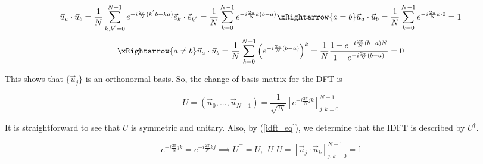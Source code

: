 \begin{equation*}
    \vec{u}_a \cdot \vec{u}_b = \frac{1}{N}\sum_{k,k^{'} = 0}^{N-1} e^{-i \frac{2\pi}{N} (k^{'}b - ka)}\vec{e}_k \cdot \vec{e}_{k^{'}} = \frac{1}{N}\sum_{k = 0}^{N-1} e^{-i \frac{2\pi}{N}k (b - a)} \xRightarrow{a=b}
    \vec{u}_a \cdot \vec{u}_b = \frac{1}{N}\sum_{k = 0}^{N-1} e^{-i \frac{2\pi}{N}k \cdot 0} = 1
\end{equation*}
\begin{equation*}
    \xRightarrow{a\neq b} \vec{u}_a \cdot \vec{u}_b = \frac{1}{N}\sum_{k = 0}^{N-1} \left(e^{-i \frac{2\pi}{N} (b - a)}\right)^k = \frac{1}{N} \frac{1 - e^{-i\frac{2\pi}{N}(b-a)N}}{1 - e^{-i\frac{2\pi}{N}(b-a)}} = 0
\end{equation*}

This shows that $\{\vec{u}_j\}$ is an orthonormal basis. So, the change of basis matrix for the DFT is 

\begin{equation}
    U = \left(\vec{u}_0, ..., \vec{u}_{N-1}\right) = \frac{1}{\sqrt{N}}\left[e^{-i\frac{2\pi}{N}jk}\right]_{j,k = 0}^{N-1}
    \label{change_basis_dft}
\end{equation}

It is straightforward to see that $U$ is symmetric and unitary. Also, by (\ref{idft_eq}), we determine that the IDFT is described by $U^\dagger$.

\begin{equation*}
    e^{-i\frac{2\pi}{N}jk} = e^{-i\frac{2\pi}{N}kj} \implies U^\intercal = U, \ \ U^\dagger U = \left[\vec{u}_j \cdot \vec{u}_k\right]_{j,k=0}^{N-1} = \mathbb{I}
\end{equation*}


